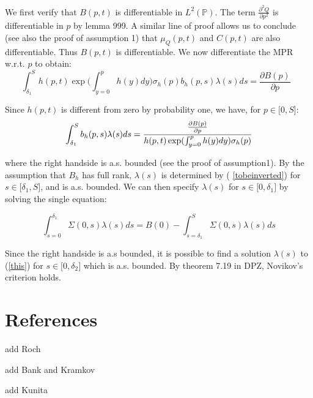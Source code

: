 \documentclass{article}
\begin{document}
We first verify that $B(p,t)$ is differentiable in $L^{2}(\mathbb{P})$. The
term $\frac{\partial ^{2}Q}{\partial p^{2}}$ is differentiable in $p$ by
lemma 999. A similar line of proof allows us to conclude (see also the proof
of assumption 1) that $\mu _{Q}(p,t)$ and $C(p,t)$ are also differentiable.
Thus $B(p,t)$ is differentiable. We now differentiate the MPR w.r.t. $p$ to
obtain:%
\begin{equation*}
\int_{\delta _{1}}^{S}{h(p,t)}\exp ({\int_{y=0}^{p}h(y)dy)}\sigma
_{h}(p)b_{h}(p,s)\lambda (s)ds=\frac{\partial B(p)}{\partial p}\text{ }
\end{equation*}

Since ${h(p,t)}$ is different from zero by probability one, we have, for $%
p\in \lbrack 0,S]$:%
\begin{equation}
\int_{\delta _{1}}^{S}b_{h}(p,s)\lambda (s)ds=\frac{\frac{\partial B(p)}{%
\partial p}}{{h(p,t)}\exp ({\int_{y=0}^{p}h(y)dy)}\sigma _{h}(p)}
\label{tobeinverted}
\end{equation}

where the right handside is a.s. bounded (see the proof of assumption1). By
the assumption that $B_{h}$ has full rank, $\lambda (s)$ is determined by (%
\ref{tobeinverted}) for $s\in \lbrack \delta _{1},S]$, and is a.s. bounded.
We can then specify $\lambda (s)$ for $s\in \lbrack 0,\delta _{1}]$ by
solving the single equation:

\begin{equation}
\int_{s=0}^{\delta _{1}}\Sigma (0,s)\lambda (s)ds=B(0)-\int_{s=\delta
_{1}}^{S}\Sigma (0,s)\lambda (s)ds  \label{this}
\end{equation}

Since the right handside is a.s bounded, it is possible to find a solution $%
\lambda (s)$ to (\ref{this}) for $s\in \lbrack 0,\delta _{2}]$ which is a.s.
bounded. By theorem 7.19 in DPZ, Novikov's criterion holds.

\section{References}

add Roch

add Bank and Kramkov

add Kunita



\end{document}
